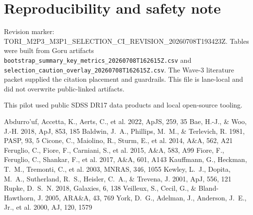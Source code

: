 \documentclass[twocolumn]{aastex631}
\begin{document}
\section*{Reproducibility and safety note}
Revision marker: TORI\_M2P3\_M3P1\_SELECTION\_CI\_REVISION\_20260708T193423Z.  Tables were built from Goru artifacts \texttt{bootstrap\_summary\_key\_metrics\_20260708T162615Z.csv} and \texttt{selection\_caution\_overlay\_20260708T162615Z.csv}.  The Wave-3 literature packet supplied the citation placement and guardrails.  This file is lane-local and did not overwrite public-linked artifacts.

\acknowledgments
This pilot used public SDSS DR17 data products and local open-source tooling.

\begin{thebibliography}{}
 Abdurro'uf, Accetta, K., Aerts, C., et al. 2022, ApJS, 259, 35
 Bae, H.-J., \& Woo, J.-H. 2018, ApJ, 853, 185
 Baldwin, J.~A., Phillips, M.~M., \& Terlevich, R. 1981, PASP, 93, 5
 Cicone, C., Maiolino, R., Sturm, E., et al. 2014, A\&A, 562, A21
 Feruglio, C., Fiore, F., Carniani, S., et al. 2015, A\&A, 583, A99
 Fiore, F., Feruglio, C., Shankar, F., et al. 2017, A\&A, 601, A143
 Kauffmann, G., Heckman, T.~M., Tremonti, C., et al. 2003, MNRAS, 346, 1055
 Kewley, L.~J., Dopita, M.~A., Sutherland, R.~S., Heisler, C.~A., \& Trevena, J. 2001, ApJ, 556, 121
 Rupke, D.~S.~N. 2018, Galaxies, 6, 138
 Veilleux, S., Cecil, G., \& Bland-Hawthorn, J. 2005, ARA\&A, 43, 769
 York, D.~G., Adelman, J., Anderson, J.~E., Jr., et al. 2000, AJ, 120, 1579
\end{thebibliography}
\end{document}
